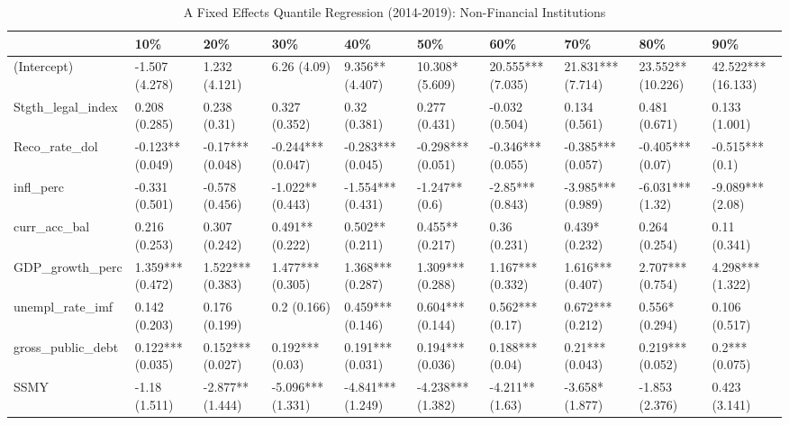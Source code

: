 \begin{table}[ht]
\centering
\caption{A Fixed Effects Quantile Regression (2014-2019): Non-Financial Institutions} 
\begingroup\small
\begin{tabular}{llllllllll}
  \toprule
 & 10\% & 20\% & 30\% & 40\% & 50\% & 60\% & 70\% & 80\% & 90\% \\ 
  \midrule
(Intercept) & -1.507 (4.278) & 1.232 (4.121) & 6.26 (4.09) & 9.356** (4.407) & 10.308* (5.609) & 20.555*** (7.035) & 21.831*** (7.714) & 23.552** (10.226) & 42.522*** (16.133) \\ 
  Stgth\_legal\_index & 0.208 (0.285) & 0.238 (0.31) & 0.327 (0.352) & 0.32 (0.381) & 0.277 (0.431) & -0.032 (0.504) & 0.134 (0.561) & 0.481 (0.671) & 0.133 (1.001) \\ 
  Reco\_rate\_dol & -0.123** (0.049) & -0.17*** (0.048) & -0.244*** (0.047) & -0.283*** (0.045) & -0.298*** (0.051) & -0.346*** (0.055) & -0.385*** (0.057) & -0.405*** (0.07) & -0.515*** (0.1) \\ 
  infl\_perc & -0.331 (0.501) & -0.578 (0.456) & -1.022** (0.443) & -1.554*** (0.431) & -1.247** (0.6) & -2.85*** (0.843) & -3.985*** (0.989) & -6.031*** (1.32) & -9.089*** (2.08) \\ 
  curr\_acc\_bal & 0.216 (0.253) & 0.307 (0.242) & 0.491** (0.222) & 0.502** (0.211) & 0.455** (0.217) & 0.36 (0.231) & 0.439* (0.232) & 0.264 (0.254) & 0.11 (0.341) \\ 
  GDP\_growth\_perc & 1.359*** (0.472) & 1.522*** (0.383) & 1.477*** (0.305) & 1.368*** (0.287) & 1.309*** (0.288) & 1.167*** (0.332) & 1.616*** (0.407) & 2.707*** (0.754) & 4.298*** (1.322) \\ 
  unempl\_rate\_imf & 0.142 (0.203) & 0.176 (0.199) & 0.2 (0.166) & 0.459*** (0.146) & 0.604*** (0.144) & 0.562*** (0.17) & 0.672*** (0.212) & 0.556* (0.294) & 0.106 (0.517) \\ 
  gross\_public\_debt & 0.122*** (0.035) & 0.152*** (0.027) & 0.192*** (0.03) & 0.191*** (0.031) & 0.194*** (0.036) & 0.188*** (0.04) & 0.21*** (0.043) & 0.219*** (0.052) & 0.2*** (0.075) \\ 
  SSMY & -1.18 (1.511) & -2.877** (1.444) & -5.096*** (1.331) & -4.841*** (1.249) & -4.238*** (1.382) & -4.211** (1.63) & -3.658* (1.877) & -1.853 (2.376) & 0.423 (3.141) \\ 
   \bottomrule
\end{tabular}
\endgroup
\end{table}
